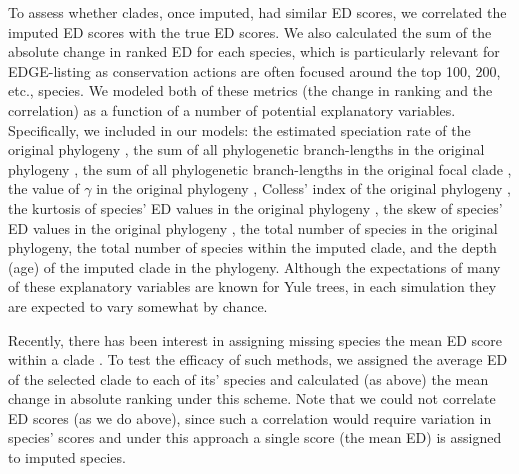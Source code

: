 \documentclass[10pt,english]{article}
\begin{document}
To assess whether clades, once imputed, had similar ED scores, we correlated the
imputed ED scores with the true ED scores. We also calculated the sum of the
absolute change in ranked ED for each species, which is particularly relevant
for EDGE-listing as conservation actions are often focused around the top 100, 200, etc., species. We modeled both of these metrics (the change
in ranking and the correlation) as a function of a number of potential
explanatory variables. Specifically, we included in our models: the estimated
speciation rate of the original phylogeny \autocite[using
\texttt{ape::yule};][]{Paradis2004}, the sum of all phylogenetic branch-lengths
in the original phylogeny \autocite[Faith's PD;][]{Faith1992}, the sum of all
phylogenetic branch-lengths in the original focal clade \autocite[Faith's
PD;][]{Faith1992}, the value of $\gamma$ in the original phylogeny \autocite[using
\texttt{phytools::gammatest};][]{Pybus2000, Revell2012}, Colless' index of the
original phylogeny
\autocite[using\texttt{apTreeshape::as.treeshape};][]{Colless1982,
Bortolussi2009}, the kurtosis of species' ED values in the original phylogeny
\autocite[using \texttt{moments::kurtosis};][]{Komsta2015}, the skew of species'
ED values in the original phylogeny \autocite[using
\texttt{moments::skew};][]{Komsta2015}, the total number of species in the
original phylogeny, the total number of species within the imputed clade, and
the depth (age) of the imputed clade in the phylogeny. Although the expectations
of many of these explanatory variables are known for Yule trees, in each
simulation they are expected to vary somewhat by chance.

Recently, there has been interest in assigning missing species the
mean ED score within a clade \autocite[see][]{Gumbs2018}. To test the
efficacy of such methods, we assigned the average ED of the selected
clade to each of its' species and calculated (as above) the mean
change in absolute ranking under this scheme. Note that we could not
correlate ED scores (as we do above), since such a correlation would require variation in species'
scores and under this approach a single score (the mean ED) is assigned to imputed species.
\end{document}
